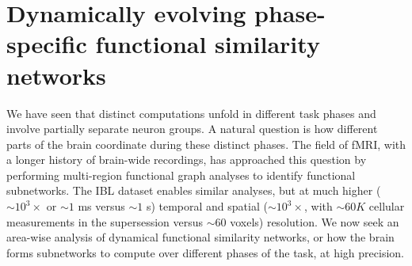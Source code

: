 \FloatBarrier

\FloatBarrier


\iffalse %
\section{Dynamically evolving phase-specific functional similarity networks}

We have seen that distinct computations unfold in different task phases and involve partially separate neuron groups. A natural question is how different parts of the brain coordinate during these distinct phases. The field of fMRI, with a longer history of brain-wide recordings, has approached this question by performing multi-region functional graph analyses to identify functional subnetworks. The IBL dataset enables similar analyses, but at much higher ($\sim 10^3 \times$ or $\sim 1$ ms versus $\sim 1$ s) temporal and spatial ($\sim 10^3 \times$, with $\sim 60K$ cellular measurements in the supersession versus $\sim 60$ voxels) resolution. We now seek an area-wise analysis of dynamical functional similarity networks, or how the brain forms subnetworks to compute over different phases of the task, at high precision. 

